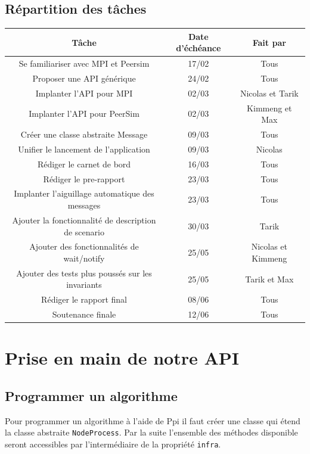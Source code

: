 \documentclass{article}
\begin{document}
			\subsection{Répartition des tâches}
			\begin{tabular}{|c|c|c|}
				\hline
				Tâche & Date d'échéance & Fait par\\[1mm]
				\hline
		  		Se familiariser avec MPI et Peersim & 17/02 & Tous\\[1mm]
				\hline
				Proposer une API générique & 24/02 & Tous\\[1mm]
				\hline
				Implanter l'API pour MPI & 02/03 & Nicolas et Tarik \\[1mm]
				\hline
				Implanter l'API pour PeerSim & 02/03 & Kimmeng et Max \\[1mm]
				\hline
				Créer une classe abstraite Message & 09/03 & Tous\\[1mm]
				\hline
				Unifier le lancement de l'application & 09/03 & Nicolas\\[1mm]
				\hline
				Rédiger le carnet de bord & 16/03 & Tous\\[1mm]
				\hline
				Rédiger le pre-rapport & 23/03 & Tous\\[1mm]
				\hline 
				Implanter l'aiguillage automatique des messages & 23/03 & Tous\\[1mm]
				\hline
				Ajouter la fonctionnalité de description de scenario & 30/03 & Tarik\\[1mm]
				\hline
				Ajouter des fonctionnalités de wait/notify & 25/05 & Nicolas et Kimmeng\\[1mm]
				\hline
				Ajouter des tests plus poussés sur les invariants & 25/05 & Tarik et Max\\[1mm]
				\hline 
				Rédiger le rapport final & 08/06 & Tous\\[1mm]
				\hline
				Soutenance finale & 12/06 & Tous\\[1mm]
				\hline
			\end{tabular}	
		
		\newpage
		\section{Prise en main de notre API}

		\subsection{Programmer un algorithme}
		Pour programmer un algorithme à l'aide de Ppi il faut créer une classe qui étend la classe abstraite \lstinline{NodeProcess}. Par la suite l'ensemble des méthodes disponible seront accessibles par l'intermédiaire de la propriété \lstinline{infra}.
\end{document}
